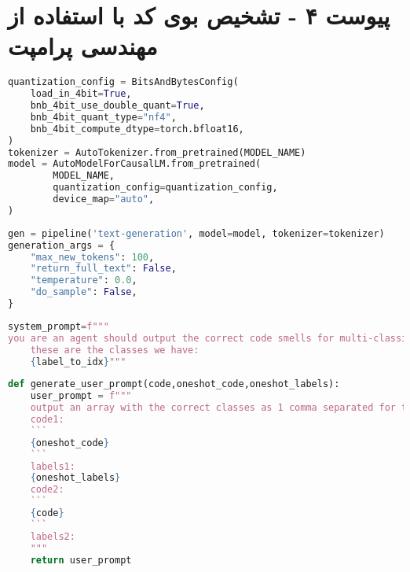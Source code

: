 \chapter*{پیوست ۴ - تشخیص بوی کد با استفاده از مهندسی پرامپت}
\label{appendix:4}
\begin{latin}
	\begin{lstlisting}[language=Python, title=\rl{بارگزاری مدل زبانی برای کار تولید متن بصورت فشرده}]
quantization_config = BitsAndBytesConfig(
    load_in_4bit=True,
    bnb_4bit_use_double_quant=True,
    bnb_4bit_quant_type="nf4",
    bnb_4bit_compute_dtype=torch.bfloat16,
)
tokenizer = AutoTokenizer.from_pretrained(MODEL_NAME)
model = AutoModelForCausalLM.from_pretrained(
        MODEL_NAME,
        quantization_config=quantization_config,
        device_map="auto",
)
\end{lstlisting}
\end{latin}

\begin{latin}
	\begin{lstlisting}[language=Python, title=\rl{تعریف پایپلاین تولید متن}]
gen = pipeline('text-generation', model=model, tokenizer=tokenizer)
generation_args = {
    "max_new_tokens": 100,
    "return_full_text": False,
    "temperature": 0.0,
    "do_sample": False,
}
\end{lstlisting}
\end{latin}

\begin{latin}
	\begin{lstlisting}[language=Python, title=\rl{تعریف پرامپت سیستم}]
system_prompt=f"""
you are an agent should output the correct code smells for multi-classification problem.
    these are the classes we have:
    {label_to_idx}"""
\end{lstlisting}
\end{latin}

\begin{latin}
	\begin{lstlisting}[language=Python, title=\rl{تولید پراپمت کاربر بصورت \lr{one-shot}}]
def generate_user_prompt(code,oneshot_code,oneshot_labels):
    user_prompt = f"""
    output an array with the correct classes as 1 comma separated for the code below:
    code1:
    ```
    {oneshot_code}
    ```
    labels1:
    {oneshot_labels}
    code2:
    ```
    {code}
    ```
    labels2:
    """
    return user_prompt
\end{lstlisting}
\end{latin}

